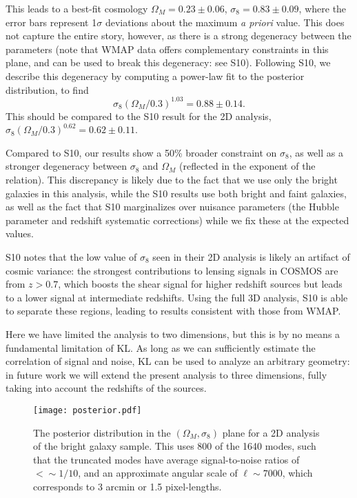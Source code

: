 This leads to a best-fit cosmology $\Omega_M = 0.23 \pm 0.06$,
$\sigma_8 = 0.83 \pm 0.09$, where the error bars represent 1$\sigma$
deviations about the maximum {\it a priori} value.
This does not capture the entire story, however, as there
is a strong degeneracy between the parameters (note that WMAP data offers
complementary constraints in this plane, and can be used to break this
degeneracy: see S10).  Following S10, we describe this degeneracy by
computing a power-law fit to the posterior distribution, to find
\begin{equation}
  \sigma_8 (\Omega_M / 0.3) ^ {1.03} = 0.88 \pm 0.14.
\end{equation}
This should be compared to the S10 result for the 2D analysis,
$\sigma_8 (\Omega_M / 0.3) ^ {0.62} = 0.62 \pm 0.11$.

Compared to S10, our results show a 50\% broader constraint on $\sigma_8$,
as well as a stronger degeneracy between $\sigma_8$ and $\Omega_M$ 
(reflected in the exponent of the relation).  This discrepancy is likely
due to the fact that we use only the bright galaxies in this analysis,
while the S10 results use both bright and faint galaxies, as well as the
fact that S10 marginalizes over nuisance parameters (the Hubble parameter
and redshift systematic corrections) while we fix these at the  expected
values.

S10 notes that the low value of $\sigma_8$ seen in their 2D analysis is likely
an artifact of cosmic variance: the strongest contributions to lensing
signals in COSMOS are from $z > 0.7$, which boosts the shear signal for higher
redshift sources but leads to a lower signal at intermediate redshifts.
Using the full 3D analysis, S10 is able to separate these regions, leading
to results consistent with those from WMAP.

Here we have limited the analysis to two dimensions, but this is by no means a
fundamental limitation of KL.  As long as we can sufficiently estimate the
correlation of signal and noise, KL can be used to analyze an arbitrary
geometry: in future work we will extend the present analysis to three
dimensions, fully taking into account the redshifts of the sources.

\begin{figure*}
 \centering
 \texttt{[image: posterior.pdf]}
 \caption{The posterior distribution in the $(\Omega_M, \sigma_8)$ plane
   for a 2D analysis of the bright galaxy sample.  This uses 800 of the
   1640 modes, such that the truncated modes have average signal-to-noise
   ratios of $<\sim 1/10$, and an approximate angular scale of
   $\ell \sim 7000$, which corresponds to 3 arcmin or 1.5 pixel-lengths.}
 \label{fig:posterior}
\end{figure*}

